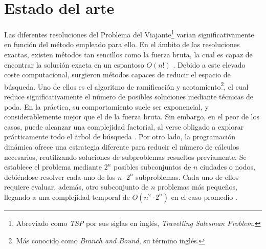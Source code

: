 %
%
%
% 
%
%
%
%

\chapter{Estado del arte}
\label{cha:estudio-teorico}

Las diferentes resoluciones del Problema del Viajante\footnote{Abreviado como \textit{TSP} por sus siglas en inglés, 
\textit{Travelling Salesman Problem}.} varían significativamente en función del método 
empleado para ello. En el ámbito de las resoluciones exactas, existen métodos tan sencillos como la 
fuerza bruta, la cual es capaz de encontrar la solución exacta en un espantoso $O(n!)$ \cite{baidoo2016}.
Debido a este elevado coste computacional, surgieron métodos capaces de reducir el espacio de búsqueda. 
Uno de ellos es el algoritmo
de ramificación y acotamiento\footnote{Más conocido como \textit{Branch and Bound}, su término inglés.},
el cual reduce significativamente el número de posibles soluciones mediante técnicas de poda. En la
práctica, su comportamiento suele ser exponencial, y considerablemente mejor que el de la fuerza bruta.
Sin embargo, en el peor de los casos, puede alcanzar una complejidad factorial, al verse obligado a 
explorar prácticamente todo el árbol de búsqueda \cite{thakoor2009}. 
Por otro lado, la programación dinámica ofrece una estrategia diferente para reducir el número de cálculos
necesarios, reutilizando soluciones de subproblemas resueltos previamente. Se establece el problema
mediante $2^n$
posibles subconjuntos de $n$ ciudades o nodos, debiéndose resolver cada uno de los $n \cdot 2^n$ 
subproblemas. Cada uno de ellos requiere evaluar, además, otro subconjunto de $n$ problemas más pequeños,
llegando a una complejidad temporal de $O(n^2 \cdot 2^n)$ en el caso promedio \cite{bouman2018}.


